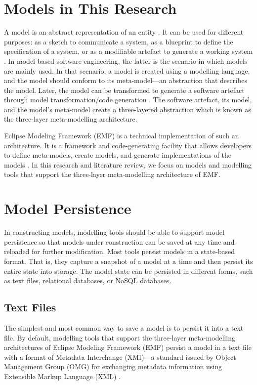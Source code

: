 \section{Models in This Research}
\label{sec:models_in_this_research)}

A model is an abstract representation of an entity \cite{volter2013model}. It can be used for different purposes: as a sketch to communicate a system, as a blueprint to define the specification of a system, or as a modifiable artefact to generate a working system \cite{fowler2019umlmode}. In model-based software engineering, the latter is the scenario in which models are mainly used.
In that scenario, a model is created using a modelling language, and the model should conform to its meta-model—an abstraction that describes the model. Later, the model can be transformed to generate a software artefact through model transformation/code generation \cite{brambilla2012model}. The software artefact, its model, and the model’s meta-model create a three-layered abstraction which is known as the three-layer meta-modelling architecture.

Eclipse Modeling Framework (EMF) \cite{steinberg2008emf} is a technical implementation of such an architecture. It is a framework and code-generating facility that allows developers to define meta-models, create models, and generate implementations of the models \cite{steinberg2008emf}. In this research and literature review, we focus on models and modelling tools that support the three-layer meta-modelling architecture of EMF.

\section{Model Persistence}
\label{sec:model_persistence}
In constructing models, modelling tools should be able to support model persistence so that models under construction can be saved at any time and reloaded for further modification. Most tools persist models in a state-based format. That is, they capture a snapshot of a model at a time and then persist its entire state into storage. The model state can be persisted in different forms, such as text files, relational databases, or NoSQL databases.

\subsection{Text Files}
\label{sec:text_file}
The simplest and most common way to save a model is to persist it into a text file. By default, modelling tools that support the three-layer meta-modelling architectures of Eclipse Modeling Framework (EMF) \cite{steinberg2008emf} persist a model in a text file with a format of Metadata Interchange (XMI)—a standard issued by Object Management Group (OMG) for exchanging metadata information using Extensible Markup Language (XML) \cite{omg2018xmi}.

